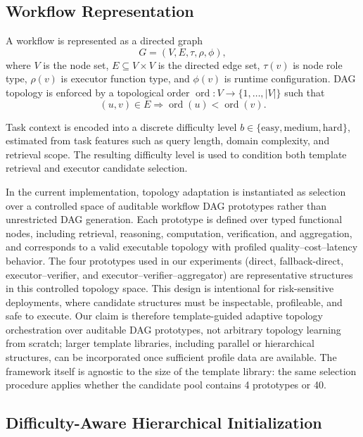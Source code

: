 \documentclass[manuscript,review,anonymous]{acmart}
\begin{document}
\subsection{Workflow Representation}

A workflow is represented as a directed graph
\begin{equation}
G=(V,E,\tau,\rho,\phi),
\end{equation}
where $V$ is the node set, $E\subseteq V\times V$ is the directed edge set, $\tau(v)$ is node role type, $\rho(v)$ is executor function type, and $\phi(v)$ is runtime configuration. DAG topology is enforced by a topological order $\operatorname{ord}:V\rightarrow\{1,\dots,|V|\}$ such that
\begin{equation}
(u,v)\in E\Rightarrow \operatorname{ord}(u)<\operatorname{ord}(v).
\end{equation}

Task context is encoded into a discrete difficulty level $b \in \{\text{easy}, \text{medium}, \text{hard}\}$, estimated from task features such as query length, domain complexity, and retrieval scope. The resulting difficulty level is used to condition both template retrieval and executor candidate selection.

In the current implementation, topology adaptation is instantiated as selection over a controlled space of auditable workflow DAG prototypes rather than unrestricted DAG generation. Each prototype is defined over typed functional nodes, including retrieval, reasoning, computation, verification, and aggregation, and corresponds to a valid executable topology with profiled quality--cost--latency behavior. The four prototypes used in our experiments (direct, fallback-direct, executor--verifier, and executor--verifier--aggregator) are representative structures in this controlled topology space. This design is intentional for risk-sensitive deployments, where candidate structures must be inspectable, profileable, and safe to execute. Our claim is therefore template-guided adaptive topology orchestration over auditable DAG prototypes, not arbitrary topology learning from scratch; larger template libraries, including parallel or hierarchical structures, can be incorporated once sufficient profile data are available. The framework itself is agnostic to the size of the template library: the same selection procedure applies whether the candidate pool contains 4 prototypes or 40.

\subsection{Difficulty-Aware Hierarchical Initialization}
\end{document}
